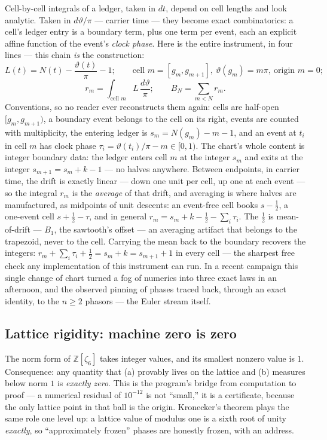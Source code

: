 \documentclass[11pt]{article}
\begin{document}
Cell-by-cell integrals of a ledger, taken in $dt$, depend on cell lengths and look
analytic.  Taken in $d\vartheta/\pi$ --- carrier time --- they become exact
combinatorics: a cell's ledger entry is a boundary term, plus one term per event, each
an explicit affine function of the event's \emph{clock phase}.  Here is the
entire instrument, in four lines --- this chain \emph{is} the construction:
\[
L(t)=N(t)-\frac{\vartheta(t)}{\pi}-1;\qquad
\text{cell } m=[g_m,g_{m+1}],\ \vartheta(g_m)=m\pi,\ \text{origin } m=0;
\]
\[
r_m=\int_{\text{cell }m} L\,\frac{d\vartheta}{\pi};\qquad
B_N=\sum_{m<N} r_m .
\]
Conventions, so no reader ever reconstructs them again: cells are half-open
$[g_m,g_{m+1})$, a boundary event belongs to the cell on its right, events are
counted with multiplicity, the entering ledger is $s_m=N(g_m)-m-1$, and an
event at $t_i$ in cell $m$ has clock phase $\tau_i=\vartheta(t_i)/\pi-m\in[0,1)$.
The chart's whole content is integer boundary data: the ledger enters cell
$m$ at the integer $s_m$ and exits at the integer $s_{m+1}=s_m+k-1$ --- no
halves anywhere.  Between endpoints, in carrier time, the drift is exactly
linear --- down one unit per cell, up one at each event --- so the integral
$r_m$ is the \emph{average} of that drift, and averaging is where halves are
manufactured, as midpoints of unit descents: an event-free cell books
$s-\tfrac12$, a one-event cell $s+\tfrac12-\tau$, and in general
$r_m=s_m+k-\tfrac12-\sum_i\tau_i$.  The $\tfrac12$ is mean-of-drift ---
$B_1$, the sawtooth's offset --- an averaging artifact that belongs to the
trapezoid, never to the cell.  Carrying the mean back to the boundary
recovers the integers:
$r_m+\sum_i\tau_i+\tfrac12=s_m+k=s_{m+1}+1$ in every cell --- the sharpest
free check any implementation of this instrument can run.  In a recent campaign this
single change of chart turned a fog of numerics into three exact laws in an
afternoon, and the observed pinning of phases traced back, through an exact
identity, to the $n\ge2$ phasors --- the Euler stream itself.

\subsection{Lattice rigidity: machine zero is zero}

The norm form of $\mathbb Z[\zeta_6]$ takes integer values, and its smallest
nonzero value is $1$.  Consequence: any quantity that (a) provably lives on the
lattice and (b) measures below norm $1$ is \emph{exactly zero}.  This is the
program's bridge from computation to proof --- a numerical residual of $10^{-12}$
is not ``small,'' it is a certificate, because the only lattice point in that ball
is the origin.  Kronecker's theorem plays the same role one level up: a lattice
value of modulus one is a sixth root of unity \emph{exactly}, so ``approximately
frozen'' phases are honestly frozen, with an address.
\end{document}
